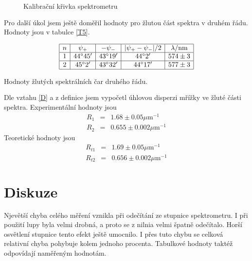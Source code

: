 \documentclass[a4paper,12pt]{article}
\begin{document}
\begin{figure}
\begin{center}

\end{center}
\caption{Kalibrační křivka spektrometru}
\label{kal}
\end{figure}

Pro další úkol jsem ještě doměřil hodnoty pro žlutou část spektra v druhém řádu. Hodnoty jsou v tabulce \ref{T5}.
\begin{table}
$$
\begin{array}{|c|c|c|c|c|}
\hline
n&  \psi_+& -\psi_-& |\psi_+-\psi_-|/2& \lambda/\mbox{nm} \\ \hline
1&  44^{\circ} 45'&  43^{\circ} 19'&  44^{\circ} 2'& 574\pm 3\\ \hline
2&  45^{\circ} 2'&   43^{\circ} 32'&  44^{\circ} 17'& 577\pm 3\\ \hline
\end{array}
$$
\caption{Hodnoty žlutých spektrálních čar druhého řádu.}
\label{T5}
\end{table}

Dle vztahu \ref{D} a z definice jsem vypočetl úhlovou disperzi mřížky ve žluté části spektra. Experimentální hodnoty jsou
\begin{eqnarray}
R_1&=&1.68\pm0.05 \mu\mbox{m}^{-1} \\
R_2&=&0.655\pm0.002 \mu\mbox{m}^{-1}
\end{eqnarray}
Teoretické hodnoty jsou
\begin{eqnarray}
R_{t1}&=&1.69\pm0.05 \mu\mbox{m}^{-1} \\
R_{t2}&=&0.656\pm0.002 \mu\mbox{m}^{-1}
\end{eqnarray}

\section{Diskuze}
Njevětší chyba celého měření vznikla při odečítání ze stupnice spektrometru. I při použití lupy byla velmi drobná, a proto se z nilnia velmi špatně odečítalo. 
Horší osvětlení stupnice tento efekt ještě umocnilo. I přes tuto chybu se celková relativní chyba pohybuje kolem jednoho procenta. Tabulkové hodnoty taktéž 
odpovídají naměřeným hodnotám. 
\end{document}
